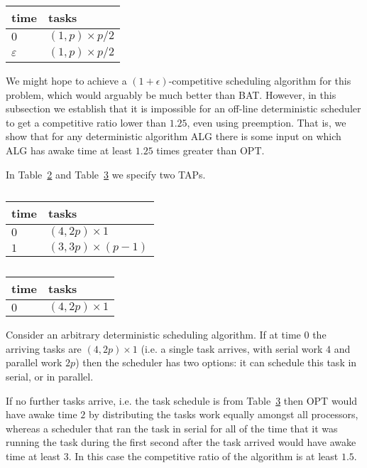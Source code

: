 \begin{table}[H]
\caption{}
\label{tab:2minusEps}
\centering
\begin{tabular}{|l|l|}
\hline
time & tasks                    \\ \hline
$0$  & $(1,p) \times p/2$       \\ \hline
$\varepsilon$  & $(1, p) \times p/2$ \\ \hline
\end{tabular}
\end{table}

We might hope to achieve a $(1+\epsilon)$-competitive scheduling
algorithm for this problem, which would arguably be much better
than BAT. However, in this subsection we
establish that it is impossible for an off-line deterministic
scheduler to get a competitive ratio lower than $1.25$, even
using preemption. That is, we show that for any deterministic
algorithm ALG there is some input on which ALG has awake time at
least $1.25$ times greater than OPT. 

In Table~\ref{tab:lowerboundFork1} and
Table~\ref{tab:lowerboundFork2} we specify two TAPs.

\begin{table}[H]
\caption{}
\label{tab:lowerboundFork1}
\centering
\begin{tabular}{|l|l|}
\hline
time & tasks                    \\ \hline
$0$  & $(4, 2p) \times 1$       \\ \hline
$1$  & $(3, 3p) \times (p-1)$ \\ \hline
\end{tabular}
\end{table}

\begin{table}[H]
\caption{}
\label{tab:lowerboundFork2}
\centering
\begin{tabular}{|l|l|}
\hline
time & tasks                    \\ \hline
$0$  & $(4, 2p) \times 1$       \\ \hline
\end{tabular}
\end{table}

Consider an arbitrary deterministic scheduling algorithm. If at
time $0$ the arriving tasks are $(4, 2p)\times 1$ (i.e. a single
task arrives, with serial work $4$ and parallel work $2p$) then
the scheduler has two options: it can schedule this task in
serial, or in parallel.

If no further tasks arrive, i.e. the task schedule is from
Table~\ref{tab:lowerboundFork2} then OPT would have awake time
$2$ by distributing the tasks work equally amongst all
processors, whereas a scheduler that ran the task in serial for
all of the time that it was running the task during the first
second after the task arrived would have awake time at least $3$.
In this case the competitive ratio of the algorithm is at least $1.5$.


